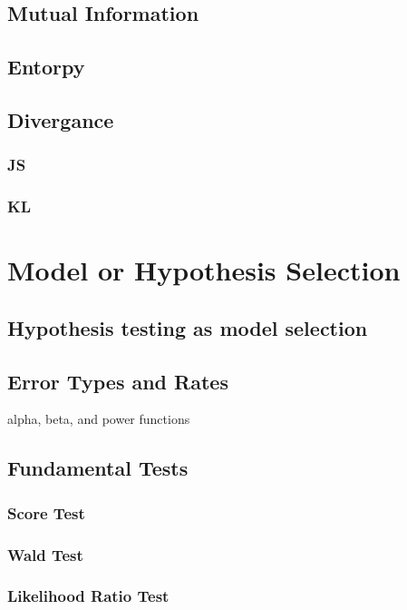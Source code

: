 \documentclass[]{article}
\begin{document}
\section{Mutual Information}

\section{Entorpy}

\section{Divergance}

\subsection{JS}

\subsection{KL}

\chapter{Model or Hypothesis Selection}

\section{Hypothesis testing as model selection}

\section{Error Types and Rates}

alpha, beta, and power functions

\section{Fundamental Tests}

\subsection{Score Test}

\subsection{Wald Test}

\subsection{Likelihood Ratio Test}
\end{document}
